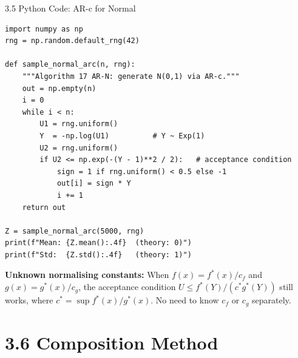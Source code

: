 \documentclass[aspectratio=169,10pt]{beamer}
\begin{document}
\begin{frame}[fragile]{3.5 Python Code: AR-c for Normal}
  \begin{lstlisting}[style=python, caption={AR-c to generate N(0,1) via half-normal and Exp(1)}]
import numpy as np
rng = np.random.default_rng(42)

def sample_normal_arc(n, rng):
    """Algorithm 17 AR-N: generate N(0,1) via AR-c."""
    out = np.empty(n)
    i = 0
    while i < n:
        U1 = rng.uniform()
        Y  = -np.log(U1)          # Y ~ Exp(1)
        U2 = rng.uniform()
        if U2 <= np.exp(-(Y - 1)**2 / 2):   # acceptance condition
            sign = 1 if rng.uniform() < 0.5 else -1
            out[i] = sign * Y
            i += 1
    return out

Z = sample_normal_arc(5000, rng)
print(f"Mean: {Z.mean():.4f}  (theory: 0)")
print(f"Std:  {Z.std():.4f}   (theory: 1)")
  \end{lstlisting}

  \medskip
  \textbf{Unknown normalising constants:}  When $f(x)=f^*(x)/c_f$ and
  $g(x)=g^*(x)/c_g$, the acceptance condition $U\le f^*(Y)/(c^*g^*(Y))$ still works,
  where $c^*=\sup f^*(x)/g^*(x)$.  No need to know $c_f$ or $c_g$ separately.
\end{frame}

\section{3.6 Composition Method}
\end{document}

